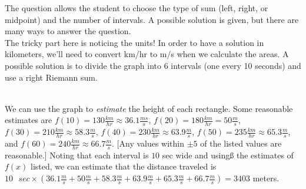 \begin{Answer}[ref=rsum4]
The question allows the student to choose the type of sum (left, right, or midpoint) and the number of intervals. A possible solution is given, but there are many ways to answer the question.\\
The tricky part here is noticing the units! In order to have a solution in kilometers, we'll need to convert km/hr to m/s when we calculate the areas. A possible solution is to divide the graph into 6 intervals (one every 10 seconds) and use a right Riemann sum.

\\
We can use the graph to \textit{estimate} the height of each rectangle. Some reasonable estimates are $f(10) = 130\frac{km}{hr}\approx36.1\frac{ms}{s}$, $f(20) = 180\frac{km}{hr}=50\frac{m}{s}$, $f(30) = 210\frac{km}{hr}\approx58.3\frac{m}{s}$, $f(40) = 230\frac{km}{hr}\approx63.9\frac{m}{s}$, $f(50) = 235\frac{km}{hr}\approx65.3\frac{m}{s}$, and $f(60) = 240\frac{km}{hr}\approx66.7\frac{m}{s}$. [Any values within $\pm5$ of the listed values are reasonable.] Noting that each interval is $10$ sec wide and usingß the estimates of $f(x)$ listed, we can estimate that the distance traveled is $10\text{ }sec\times(36.1\frac{m}{s}+50\frac{m}{s}+58.3\frac{m}{s}+63.9\frac{m}{s}+65.3\frac{m}{s}+66.7\frac{m}{s})=3403$ meters.
\end{Answer}